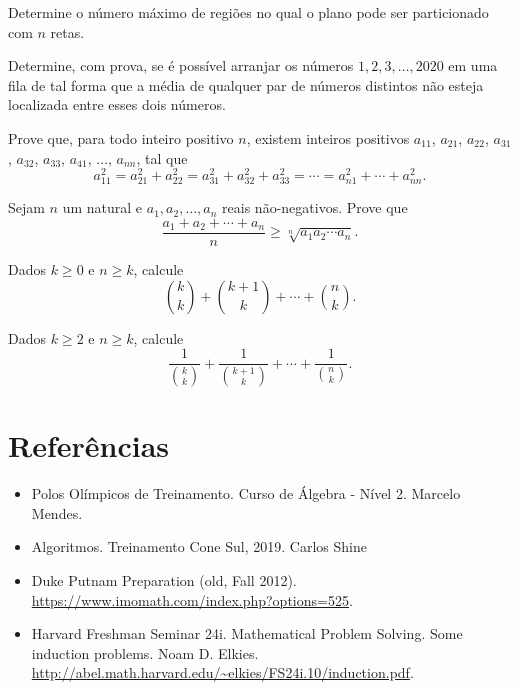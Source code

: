 \documentclass[10pt, a4paper]{article}
\begin{document}
	\begin{prob}
		Determine o número máximo de regiões no qual o plano pode ser particionado com $n$ retas.
	\end{prob}

	\begin{prob}
		Determine, com prova, se é possível arranjar os números $1, 2, 3, \dots, 2020$ em uma fila de tal forma que a média de qualquer par de números distintos não esteja localizada entre esses dois números.
	\end{prob}

	\begin{prob}
		Prove que, para todo inteiro positivo $n$, existem inteiros positivos $a_{11}$, $a_{21}$, $a_{22}$, $a_{31}$, $a_{32}$, $a_{33}$, $a_{41}$, $\dots$, $a_{nn}$, tal que \[a_{11}^2 = a_{21}^2 + a_{22}^2 = a_{31}^2 + a_{32}^2 + a_{33}^2 = \cdots = a_{n1}^2 + \cdots + a_{nn}^2.\]
	\end{prob}

	\begin{prob}[MA $\ge$ MG]
		Sejam $n$ um natural e $a_1, a_2, \dots, a_n$ reais não-negativos. Prove que \[\frac{a_1 + a_2 + \cdots + a_n}{n} \ge \sqrt[n]{a_1 a_2 \cdots a_n}.\]
	\end{prob}


	\begin{prob}
		Dados $k \ge 0$ e $n \ge k$, calcule \[\binom{k}{k} + \binom{k+1}{k} + \cdots + \binom{n}{k}.\]
	\end{prob}

	\begin{prob}
		Dados $k \ge 2$ e $n \ge k$, calcule \[\frac{1}{\binom{k}{k}} + \frac{1}{\binom{k+1}{k}} + \cdots + \frac{1}{\binom{n}{k}}.\]
	\end{prob}



	\section{Referências}

	\begin{itemize}
		\item Polos Olímpicos de Treinamento. Curso de Álgebra - Nível 2. Marcelo Mendes.
		\item Algoritmos. Treinamento Cone Sul, 2019. Carlos Shine
		\item Duke Putnam Preparation (old, Fall 2012). \url{https://www.imomath.com/index.php?options=525}.
		\item Harvard Freshman Seminar 24i. Mathematical Problem Solving. Some induction problems. Noam D. Elkies. \url{http://abel.math.harvard.edu/~elkies/FS24i.10/induction.pdf}.
	\end{itemize}

\end{document}
